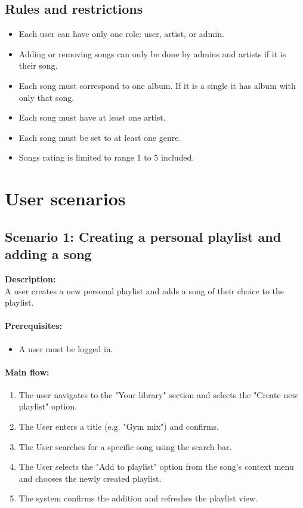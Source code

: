 \documentclass[11pt, a4paper]{article}
\begin{document}
\subsection{Rules and restrictions}
\begin{itemize}
    \item Each user can have only one role: user, artist, or admin.
    \item Adding or removing songs can only be done by admins and artists if it is their song.
    \item Each song must correspond to one album. If it is a single it has album with only that song.
    \item Each song must have at least one artist.
    \item Each song must be set to at least one genre.
    \item Songs rating is limited to range 1 to 5 included.
\end{itemize}


\newpage
\section{User scenarios}
\label{sec:scenarios}

\subsection{Scenario 1: Creating a personal playlist and adding a song}

\textbf{Description:}\\
A user creates a new personal playlist and adds a song of their choice to the playlist.

\paragraph{Prerequisites:}
\begin{itemize}
    \item A user must be logged in.
\end{itemize}

\paragraph{Main flow:}
\begin{enumerate}
    \item The user navigates to the "Your library" section and selects the "Create new playlist" option.
    \item The User enters a title (e.g. "Gym mix") and confirms.
    \item The User searches for a specific song using the search bar.
    \item The User selects the "Add to playlist" option from the song's context menu and chooses the newly created playlist.
    \item The system confirms the addition and refreshes the playlist view.
\end{enumerate}
\end{document}
